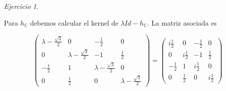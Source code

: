 \documentclass[11pt,a4paper]{article}
\theoremstyle{definition}
\theoremstyle{remark}
\newtheorem{exc}{Ejercicio}
\begin{document}
\begin{exc}
\begin{enumerate}
						Para $ h_\mathbb{C} $ debemos calcular el kernel de $ \lambda Id-h_\mathbb{C} $. La matriz asociada es
						
						\begin{equation}
						\begin{pmatrix}
				    	\lambda-\frac{\sqrt{3}}{2} & 0 & -\frac{1}{2} & 0
				    	\\ 0 & \lambda-\frac{\sqrt{3}}{2} & -1 & \frac{1}{2} 
				    	\\ -\frac{1}{2} & 1 & \lambda-\frac{\sqrt{3}}{2} & 0
				    	\\ 0 & \frac{1}{2} & 0 & \lambda-\frac{\sqrt{3}}{2}
				    	\end{pmatrix} = 
				    	\begin{pmatrix}
				    	i\frac{1}{2} & 0 & -\frac{1}{2} & 0
				    	\\ 0 & i\frac{1}{2} & -1 & \frac{1}{2} 
				    	\\ -\frac{1}{2} & 1 & i\frac{1}{2} & 0
				    	\\ 0 & \frac{1}{2} & 0 & i\frac{1}{2}
				    	\end{pmatrix} \nonumber
						\end{equation}
					

\end{enumerate}
\end{exc}
\end{document}

